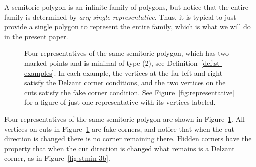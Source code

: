 \documentclass[10pt,a4paper]{amsart}
\numberwithin{equation}{section}
\theoremstyle{definition}
\theoremstyle{plain}
\theoremstyle{plain}
\begin{document}
A semitoric polygon is an infinite family of polygons, but notice that the entire family is determined by \emph{any single representative}. Thus, it is typical to just provide a single polygon to represent the entire family, which is what we will do in the present paper.

\begin{figure}
 \centering
 \caption{Four representatives of the same semitoric polygon, which has two marked points and is minimal of type (2), see Definition~\ref{def:st-examples}. In each example, the vertices at the far left and right satisfy the Delzant corner conditions, and the two vertices on the cuts satisfy the fake corner condition. See Figure~\ref{fig:representative} for a figure of just one representative with its vertices labeled.}
 \label{fig:semitoric-4reps-example}
\end{figure}

Four representatives of the same semitoric polygon are shown in Figure~\ref{fig:semitoric-4reps-example}.
All vertices on cuts in Figure~\ref{fig:semitoric-4reps-example} are fake corners, and notice that when the cut direction is changed there is no corner remaining there. Hidden corners have the property that when the cut direction is changed what remains is a Delzant corner, as in Figure~\ref{fig:stmin-3b}.
\end{document}
